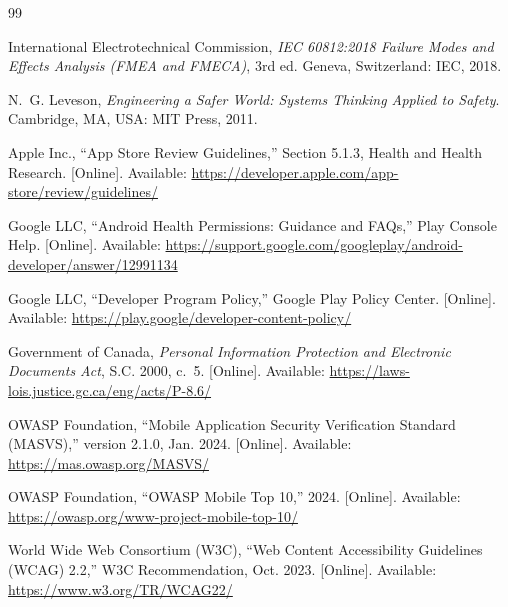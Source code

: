 \documentclass{article}
\begin{document}
\begin{thebibliography}{99}

  International Electrotechnical Commission, \emph{IEC 60812:2018 Failure Modes
    and Effects Analysis (FMEA and FMECA)}, 3rd ed. Geneva, Switzerland: IEC,
  2018.

  N.~G. Leveson, \emph{Engineering a Safer World: Systems Thinking Applied to
    Safety}. Cambridge, MA, USA: MIT Press, 2011.

  Apple Inc., ``App Store Review Guidelines,'' Section 5.1.3, Health and Health
  Research. [Online]. Available:
  \url{https://developer.apple.com/app-store/review/guidelines/}

  Google LLC, ``Android Health Permissions: Guidance and FAQs,'' Play Console
  Help. [Online]. Available:
  \url{https://support.google.com/googleplay/android-developer/answer/12991134}

  Google LLC, ``Developer Program Policy,'' Google Play Policy Center.
    [Online]. Available: \url{https://play.google/developer-content-policy/}

  Government of Canada, \emph{Personal Information Protection and Electronic
    Documents Act}, S.C. 2000, c.~5. [Online]. Available:
  \url{https://laws-lois.justice.gc.ca/eng/acts/P-8.6/}

  OWASP Foundation, ``Mobile Application Security Verification Standard
  (MASVS),'' version 2.1.0, Jan. 2024. [Online]. Available:
  \url{https://mas.owasp.org/MASVS/}

  OWASP Foundation, ``OWASP Mobile Top 10,'' 2024. [Online]. Available:
  \url{https://owasp.org/www-project-mobile-top-10/}

  World Wide Web Consortium (W3C), ``Web Content Accessibility Guidelines (WCAG)
  2.2,'' W3C Recommendation, Oct. 2023. [Online]. Available:
  \url{https://www.w3.org/TR/WCAG22/}

\end{thebibliography}
\end{document}
